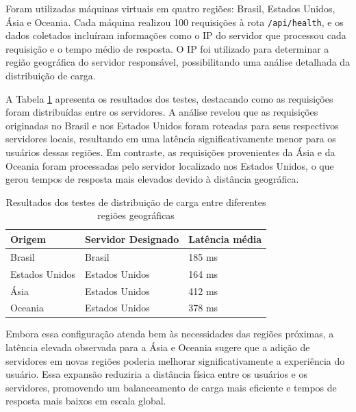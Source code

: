 Foram utilizadas máquinas virtuais em quatro regiões: Brasil, Estados Unidos, Ásia e Oceania. Cada máquina realizou 100 requisições à rota \texttt{/api/health}, e os dados coletados incluíram informações como o IP do servidor que processou cada requisição e o tempo médio de resposta. O IP foi utilizado para determinar a região geográfica do servidor responsável, possibilitando uma análise detalhada da distribuição de carga.

A Tabela \ref{tab:geo-distribution} apresenta os resultados dos testes, destacando como as requisições foram distribuídas entre os servidores. A análise revelou que as requisições originadas no Brasil e nos Estados Unidos foram roteadas para seus respectivos servidores locais, resultando em uma latência significativamente menor para os usuários dessas regiões. Em contraste, as requisições provenientes da Ásia e da Oceania foram processadas pelo servidor localizado nos Estados Unidos, o que gerou tempos de resposta mais elevados devido à distância geográfica.

\begin{table}[H]
    \centering
    \caption{Resultados dos testes de distribuição de carga entre diferentes regiões geográficas}
    \label{tab:geo-distribution}
    \begin{tabular}{|l|l|l|}
        \hline
        \textbf{Origem}   & \textbf{Servidor Designado} & \textbf{Latência média} \\ \hline
        Brasil         & Brasil                      & 185 ms                  \\ \hline
        Estados Unidos & Estados Unidos              & 164 ms                  \\ \hline
        Ásia           & Estados Unidos              & 412 ms                  \\ \hline
        Oceania        & Estados Unidos              & 378 ms                  \\ \hline
    \end{tabular}
\end{table}

Embora essa configuração atenda bem às necessidades das regiões próximas, a latência elevada observada para a Ásia e Oceania sugere que a adição de servidores em novas regiões poderia melhorar significativamente a experiência do usuário. Essa expansão reduziria a distância física entre os usuários e os servidores, promovendo um balanceamento de carga mais eficiente e tempos de resposta mais baixos em escala global.


